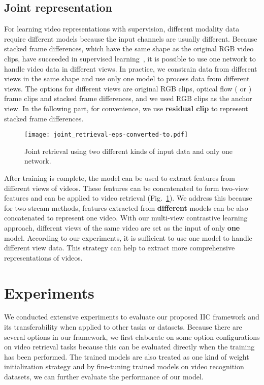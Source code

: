 \documentclass[sigconf]{acmart}
\begin{document}
\subsection{Joint representation}
For learning video representations with supervision, different modality data require different models because the input channels are usually different. Because stacked frame differences, which have the same shape as the original RGB video clips, have succeeded in supervised learning~\cite{tao2020rethinking}, it is possible to use one network to handle video data in different views. In practice, we constrain data from different views in the same shape and use only one model to process data from different views. The options for different views are original RGB clips, optical flow ( or ) frame clips and stacked frame differences, and we used RGB clips as the anchor view. In the following part, for convenience, we use \textbf{residual clip} to represent stacked frame differences.

\begin{figure}[t]
  \centering
  \texttt{[image: joint\_retrieval-eps-converted-to.pdf]}
  \caption{Joint retrieval using two different kinds of input data and only one network.}
  \label{joint_retrieval}
\end{figure} 

After training is complete, the model can be used to extract features from different views of videos. These features can be concatenated to form two-view features and can be applied to video retrieval (Fig.~\ref{joint_retrieval}). We address this because for two-stream methods, features extracted from \textbf{different} models can be also concatenated to represent one video. With our multi-view contrastive learning approach, different views of the same video are set as the input of only \textbf{one} model. According to our experiments, it is sufficient to use one model to handle different view data. This strategy can help to extract more comprehensive representations of videos.

\section{Experiments}
We conducted extensive experiments to evaluate our proposed IIC framework and its transferability when applied to other tasks or datasets. Because there are several options in our framework, we first elaborate on some option configurations on video retrieval tasks because this can be evaluated directly when the training has been performed. The trained models are also treated as one kind of weight initialization strategy and by fine-tuning trained models on video recognition datasets, we can further evaluate the performance of our model.
\end{document}
